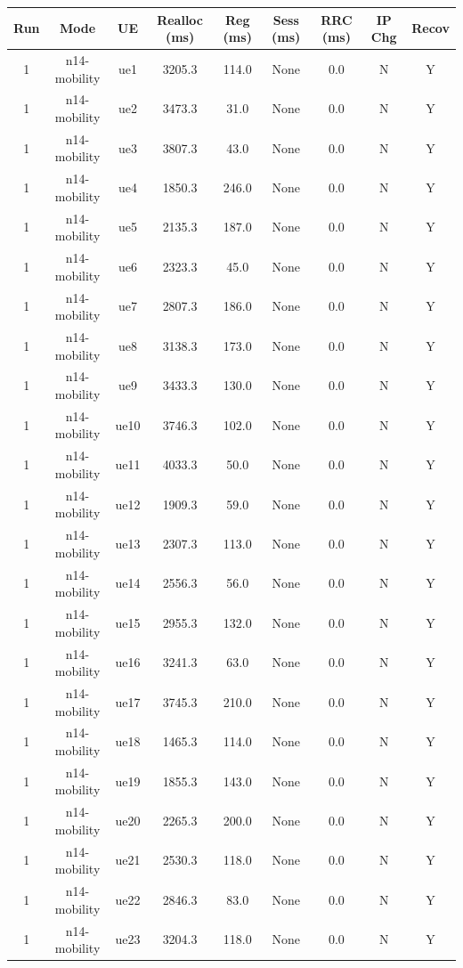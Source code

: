 \begin{table}[ht]
\centering
\begin{tabular}{|c|c|c|c|c|c|c|c|c|}
\hline
Run & Mode & UE & Realloc (ms) & Reg (ms) & Sess (ms) & RRC (ms) & IP Chg & Recov \\
\hline
1 & n14-mobility & ue1 & 3205.3 & 114.0 & None & 0.0 & N & Y \\
1 & n14-mobility & ue2 & 3473.3 & 31.0 & None & 0.0 & N & Y \\
1 & n14-mobility & ue3 & 3807.3 & 43.0 & None & 0.0 & N & Y \\
1 & n14-mobility & ue4 & 1850.3 & 246.0 & None & 0.0 & N & Y \\
1 & n14-mobility & ue5 & 2135.3 & 187.0 & None & 0.0 & N & Y \\
1 & n14-mobility & ue6 & 2323.3 & 45.0 & None & 0.0 & N & Y \\
1 & n14-mobility & ue7 & 2807.3 & 186.0 & None & 0.0 & N & Y \\
1 & n14-mobility & ue8 & 3138.3 & 173.0 & None & 0.0 & N & Y \\
1 & n14-mobility & ue9 & 3433.3 & 130.0 & None & 0.0 & N & Y \\
1 & n14-mobility & ue10 & 3746.3 & 102.0 & None & 0.0 & N & Y \\
1 & n14-mobility & ue11 & 4033.3 & 50.0 & None & 0.0 & N & Y \\
1 & n14-mobility & ue12 & 1909.3 & 59.0 & None & 0.0 & N & Y \\
1 & n14-mobility & ue13 & 2307.3 & 113.0 & None & 0.0 & N & Y \\
1 & n14-mobility & ue14 & 2556.3 & 56.0 & None & 0.0 & N & Y \\
1 & n14-mobility & ue15 & 2955.3 & 132.0 & None & 0.0 & N & Y \\
1 & n14-mobility & ue16 & 3241.3 & 63.0 & None & 0.0 & N & Y \\
1 & n14-mobility & ue17 & 3745.3 & 210.0 & None & 0.0 & N & Y \\
1 & n14-mobility & ue18 & 1465.3 & 114.0 & None & 0.0 & N & Y \\
1 & n14-mobility & ue19 & 1855.3 & 143.0 & None & 0.0 & N & Y \\
1 & n14-mobility & ue20 & 2265.3 & 200.0 & None & 0.0 & N & Y \\
1 & n14-mobility & ue21 & 2530.3 & 118.0 & None & 0.0 & N & Y \\
1 & n14-mobility & ue22 & 2846.3 & 83.0 & None & 0.0 & N & Y \\
1 & n14-mobility & ue23 & 3204.3 & 118.0 & None & 0.0 & N & Y \\

\end{tabular}
\end{table}
